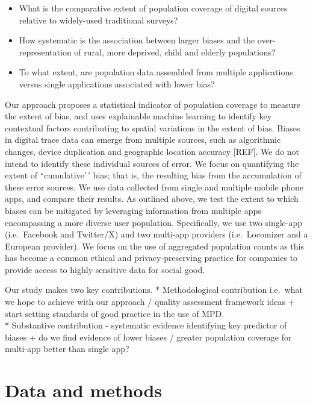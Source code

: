 \documentclass[]{rsos}%
\providecommand{\tightlist}{%
  \setlength{\itemsep}{0pt}\setlength{\parskip}{0pt}}
\begin{document}
\begin{itemize}
\tightlist
\item
  What is the comparative extent of population coverage of digital
  sources relative to widely-used traditional surveys?
\item
  How systematic is the association between larger biases and the
  over-representation of rural, more deprived, child and elderly
  populations?
\item
  To what extent, are population data assembled from multiple
  applications versus single applications associated with lower bias?
\end{itemize}

Our approach proposes a statistical indicator of population coverage to
measure the extent of bias, and uses explainable machine learning to
identify key contextual factors contributing to spatial variations in
the extent of bias. Biases in digital trace data can emerge from
multiple sources, such as algorithmic changes, device duplication and
geographic location accuracy {[}REF{]}. We do not intend to identify these
individual sources of error. We focus on quantifying the extent of
``cumulative'\,' bias; that is, the resulting bias from the accumulation
of these error sources. We use data collected from single and multiple
mobile phone apps, and compare their results. As outlined above, we test
the extent to which biases can be mitigated by leveraging information
from multiple apps encompassing a more diverse user population.
Specifically, we use two single-app (i.e.~Facebook and Twitter/X) and
two multi-app providers (i.e.~Locomizer and a European provider). We
focus on the use of aggregated population counts as this has become a
common ethical and privacy-preserving practice for companies to provide
access to highly sensitive data for social good.

Our study makes two key contributions. * Methodological contribution
i.e.~what we hope to achieve with our approach / quality assessment
framework ideas + start setting standards of good practice in the use of
MPD.\\
* Substantive contribution - systematic evidence identifying key
predictor of biases + do we find evidence of lower biases / greater
population coverage for multi-app better than single app?

\section{Data and methods}\label{data-and-methods}
\end{document}

